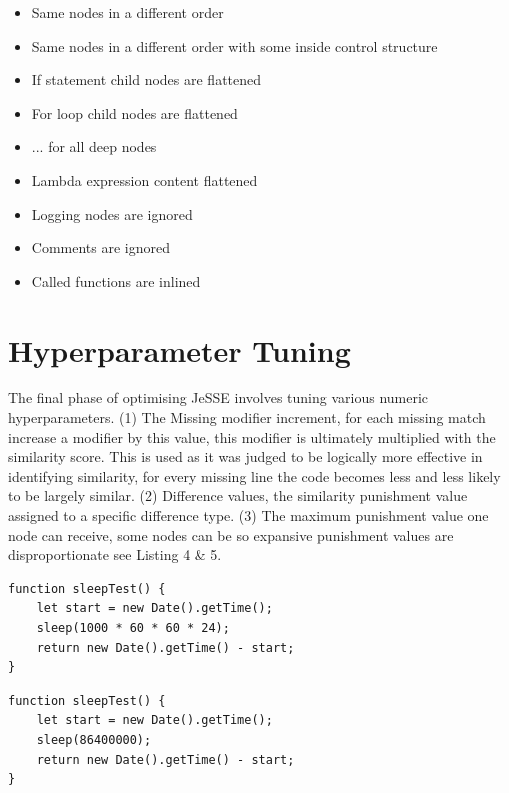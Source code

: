 \documentclass[jou,apacite]{apa6}
\begin{document}
\begin{itemize}
  		\setlength\itemsep{-0.2em}
		\item Same nodes in a different order
		\item Same nodes in a different order with some inside control structure 
		\item If statement child nodes are flattened
		\item For loop child nodes are flattened
		\item ... for all deep nodes
		\item Lambda expression content flattened
		\item Logging nodes are ignored
		\item Comments are ignored
		\item Called functions are inlined
	\end{itemize}

\clearpage

\section{Hyperparameter Tuning}
The final phase of optimising JeSSE involves tuning various numeric hyperparameters. (1) The Missing modifier increment, for each missing match increase a modifier by this value, this modifier is ultimately multiplied with the similarity score. This is used as it was judged to be logically more effective in identifying similarity, for every missing line the code becomes less and less likely to be largely similar. (2) Difference values, the similarity punishment value assigned to a specific difference type. (3) The maximum punishment value one node can receive, some nodes can be so expansive punishment values are disproportionate see Listing 4 \& 5.

\begin{lstlisting}[caption=Function returning contents of previous call expression]
function sleepTest() {
    let start = new Date().getTime();
    sleep(1000 * 60 * 60 * 24);
    return new Date().getTime() - start;
}
\end{lstlisting}

\begin{lstlisting}[caption=Function returning contents of previous call expression]
function sleepTest() {
    let start = new Date().getTime();
    sleep(86400000);
    return new Date().getTime() - start;
}

\end{lstlisting}
\end{document}
